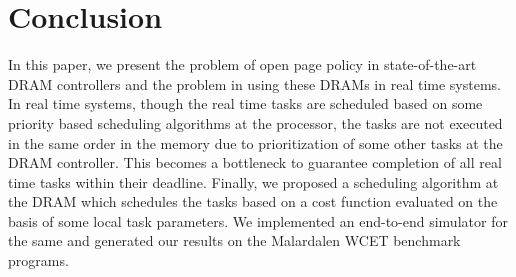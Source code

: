 \section{Conclusion} \label{con}
\noindent
In this paper, we present the problem of open page policy in state-of-the-art DRAM controllers and the problem in 
using these DRAMs in real time systems. In real time systems, though the real time tasks are scheduled based on some priority
based scheduling algorithms at the processor, the tasks are not executed in the same order in the memory due to prioritization
of some other tasks at the DRAM controller. This becomes a bottleneck to guarantee 
completion of all real time tasks within their deadline. Finally, we proposed a scheduling algorithm at the DRAM which 
schedules the tasks based on a cost function evaluated on the basis of some local task parameters. We implemented an 
end-to-end simulator for the same and generated our results on the Malardalen WCET benchmark programs.


